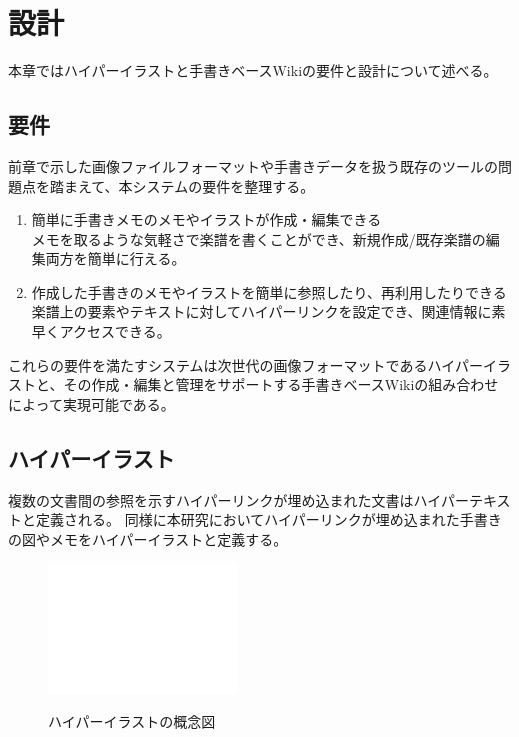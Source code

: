 \chapter{設計}
\label{chap:sekkei}

本章ではハイパーイラストと手書きベースWikiの要件と設計について述べる。

\newpage

\section{要件}
前章で示した画像ファイルフォーマットや手書きデータを扱う既存のツールの問題点を踏まえて、本システムの要件を整理する。
\begin{enumerate}
    \item 簡単に手書きメモのメモやイラストが作成・編集できる\\
    メモを取るような気軽さで楽譜を書くことができ、新規作成/既存楽譜の編集両方を簡単に行える。
    \item 作成した手書きのメモやイラストを簡単に参照したり、再利用したりできる\\
    楽譜上の要素やテキストに対してハイパーリンクを設定でき、関連情報に素早くアクセスできる。
\end{enumerate}
これらの要件を満たすシステムは次世代の画像フォーマットであるハイパーイラストと、その作成・編集と管理をサポートする手書きベースWikiの組み合わせによって実現可能である。

\section{ハイパーイラスト}
複数の文書間の参照を示すハイパーリンクが埋め込まれた文書はハイパーテキストと定義される。
同様に本研究においてハイパーリンクが埋め込まれた手書きの図やメモをハイパーイラストと定義する。\\

\begin{figure}[htbp]
    \begin{center}
    {\includegraphics[width=50mm]{images/testimage.png}} \end{center}
    \caption{ハイパーイラストの概念図}
\end{figure}

